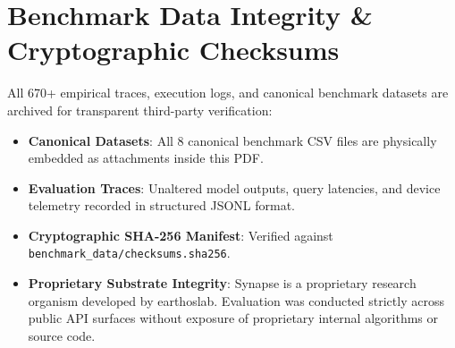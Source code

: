 \documentclass[11pt,a4paper]{article}
\begin{document}
\section{Benchmark Data Integrity \& Cryptographic Checksums}
All 670+ empirical traces, execution logs, and canonical benchmark datasets are archived for transparent third-party verification:
\begin{itemize}[leftmargin=1.5em, itemsep=1pt, topsep=1pt]
  \item \textbf{Canonical Datasets}: All 8 canonical benchmark CSV files are physically embedded as attachments inside this PDF.
  \item \textbf{Evaluation Traces}: Unaltered model outputs, query latencies, and device telemetry recorded in structured JSONL format.
  \item \textbf{Cryptographic SHA-256 Manifest}: Verified against \nolinkurl{benchmark_data/checksums.sha256}.
  \item \textbf{Proprietary Substrate Integrity}: Synapse is a proprietary research organism developed by earthoslab. Evaluation was conducted strictly across public API surfaces without exposure of proprietary internal algorithms or source code.
\end{itemize}

\vspace{-0.2em}
\end{document}
